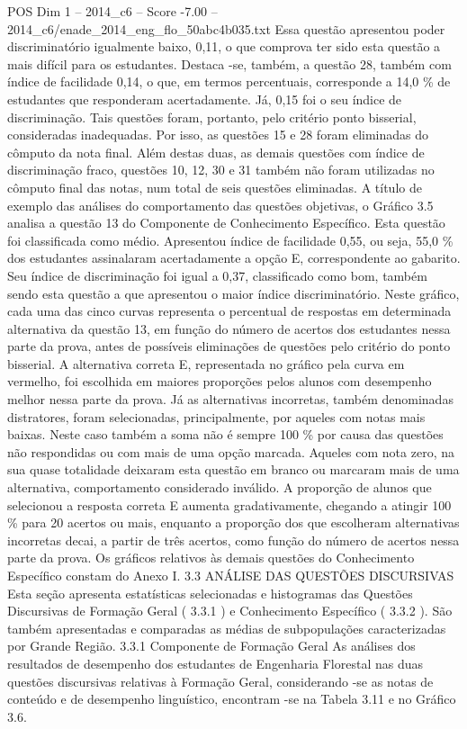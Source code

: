 \begin{textsample}{POS Dim 1 – 2014\_c6 – Score -7.00 – 2014\_c6/enade\_2014\_eng\_flo\_50abc4b035.txt}
Essa questão apresentou poder discriminatório igualmente baixo, 0,11, o que comprova ter sido esta questão a mais difícil para os estudantes.
Destaca -se, também, a questão 28, também com índice de facilidade 0,14, o que, em termos percentuais, corresponde a 14,0 \% de estudantes que responderam acertadamente.
Já, 0,15 foi o seu índice de discriminação.
Tais questões foram, portanto, pelo critério ponto bisserial, consideradas inadequadas.
Por isso, as questões 15 e 28 foram eliminadas do cômputo da nota final.
Além destas duas, as demais questões com índice de discriminação fraco, questões 10, 12, 30 e 31 também não foram utilizadas no cômputo final das notas, num total de seis questões eliminadas.
A título de exemplo das análises do comportamento das questões objetivas, o Gráfico 3.5 analisa a questão 13 do Componente de Conhecimento Específico.
Esta questão foi classificada como médio.
Apresentou índice de facilidade 0,55, ou seja, 55,0 \% dos estudantes assinalaram acertadamente a opção E, correspondente ao gabarito.
Seu índice de discriminação foi igual a 0,37, classificado como bom, também sendo esta questão a que apresentou o maior índice discriminatório.
Neste gráfico, cada uma das cinco curvas representa o percentual de respostas em determinada alternativa da questão 13, em função do número de acertos dos estudantes nessa parte da prova, antes de possíveis eliminações de questões pelo critério do ponto bisserial.
A alternativa correta E, representada no gráfico pela curva em vermelho, foi escolhida em maiores proporções pelos alunos com desempenho melhor nessa parte da prova.
Já as alternativas incorretas, também denominadas distratores, foram selecionadas, principalmente, por aqueles com notas mais baixas.
Neste caso também a soma não é sempre 100 \% por causa das questões não respondidas ou com mais de uma opção marcada.
Aqueles com nota zero, na sua quase totalidade deixaram esta questão em branco ou marcaram mais de uma alternativa, comportamento considerado inválido.
A proporção de alunos que selecionou a resposta correta E aumenta gradativamente, chegando a atingir 100 \% para 20 acertos ou mais, enquanto a proporção dos que escolheram alternativas incorretas decai, a partir de três acertos, como função do número de acertos nessa parte da prova.
Os gráficos relativos às demais questões do Conhecimento Específico constam do Anexo I. 3.3 ANÁLISE DAS QUESTÕES DISCURSIVAS Esta seção apresenta estatísticas selecionadas e histogramas das Questões Discursivas de Formação Geral ( 3.3.1 ) e Conhecimento Específico ( 3.3.2 ).
São também apresentadas e comparadas as médias de subpopulações caracterizadas por Grande Região. 3.3.1 Componente de Formação Geral As análises dos resultados de desempenho dos estudantes de Engenharia Florestal nas duas questões discursivas relativas à Formação Geral, considerando -se as notas de conteúdo e de desempenho linguístico, encontram -se na Tabela 3.11 e no Gráfico 3.6.

\end{textsample}
